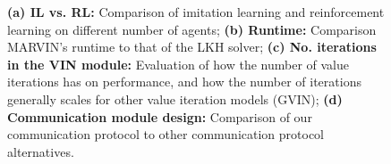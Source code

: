 \begin{figure}[t]
\begin{small}
\begin{tabular}{llll}
\end{tabular}
\end{small}
\fi
\vspace{-0.1in}
\caption{\textbf{(a) IL vs. RL:} Comparison of imitation learning and reinforcement learning on different number of agents;
\textbf{(b) Runtime:} Comparison MARVIN's runtime to that of the LKH solver;
\textbf{(c) No. iterations in the VIN module:} Evaluation of how the number of value iterations has on performance, and how the number of
    iterations generally scales for other value iteration models (GVIN);
\textbf{(d) Communication module design:} Comparison of our communication protocol to other communication protocol alternatives.
}
\label{fig:all}
\end{figure}
